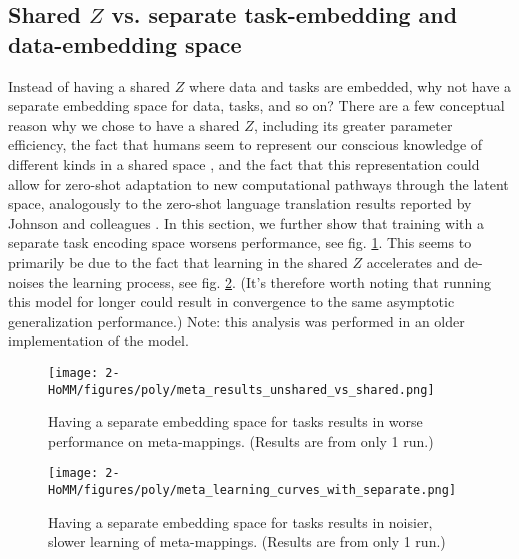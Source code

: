 \subsection{Shared $Z$ vs. separate task-embedding and data-embedding space} \label{app_lesion_results_shared_z}
Instead of having a shared $Z$ where data and tasks are embedded, why not have a separate embedding space for data, tasks, and so on? There are a few conceptual reason why we chose to have a shared $Z$, including its greater parameter efficiency, the fact that humans seem to represent our conscious knowledge of different kinds in a shared space \citep[][]{Baars2005}, and the fact that this representation could allow for zero-shot adaptation to new computational pathways through the latent space, analogously to the zero-shot language translation results reported by Johnson and colleagues \citep{Johnson2016a}. In this section, we further show that training with a separate task encoding space worsens performance, see fig. \ref{supp_lesion_shared_z_fig}. This seems to primarily be due to the fact that learning in the shared $Z$ accelerates and de-noises the learning process, see fig. \ref{supp_lesion_shared_z_learn_fig}. (It's therefore worth noting that running this model for longer could result in convergence to the same asymptotic generalization performance.) Note: this analysis was performed in an older implementation of the model. \par
\begin{figure}[H]
\centering
\texttt{[image: 2-HoMM/figures/poly/meta\_results\_unshared\_vs\_shared.png]}
\caption[Having a separate embedding space for tasks results in worse performance on meta-mappings.]{Having a separate embedding space for tasks results in worse performance on meta-mappings. (Results are from only 1 run.)}
\label{supp_lesion_shared_z_fig}
\end{figure}

\begin{figure}[H]
\centering
\texttt{[image: 2-HoMM/figures/poly/meta\_learning\_curves\_with\_separate.png]}
\caption[Having a separate embedding space for tasks results in noisier, slower learning of meta-mappings.]{Having a separate embedding space for tasks results in noisier, slower learning of meta-mappings. (Results are from only 1 run.)}
\label{supp_lesion_shared_z_learn_fig}
\end{figure}

